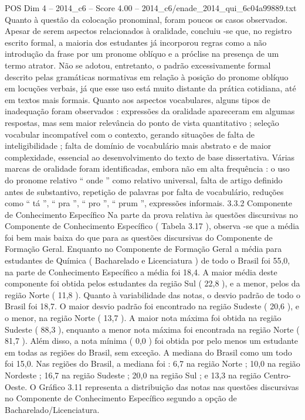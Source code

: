 \begin{textsample}{POS Dim 4 – 2014\_c6 – Score 4.00 – 2014\_c6/enade\_2014\_qui\_6c04a99889.txt}
Quanto à questão da colocação pronominal, foram poucos os casos observados.
Apesar de serem aspectos relacionados à oralidade, concluiu -se que, no registro escrito formal, a maioria dos estudantes já incorporou regras como a não introdução da frase por um pronome oblíquo e a próclise na presença de um termo atrator.
Não se adotou, entretanto, o padrão excessivamente formal descrito pelas gramáticas normativas em relação à posição do pronome oblíquo em locuções verbais, já que esse uso está muito distante da prática cotidiana, até em textos mais formais.
Quanto aos aspectos vocabulares, alguns tipos de inadequação foram observados : expressões da oralidade apareceram em algumas respostas, mas sem maior relevância do ponto de vista quantitativo ; seleção vocabular incompatível com o contexto, gerando situações de falta de inteligibilidade ; falta de domínio de vocabulário mais abstrato e de maior complexidade, essencial ao desenvolvimento do texto de base dissertativa.
Várias marcas de oralidade foram identificadas, embora não em alta frequência : o uso do pronome relativo “ onde ” como relativo universal, falta de artigo definido antes de substantivo, repetição de palavras por falta de vocabulário, reduções como “ tá ”, “ pra ”, “ pro ”, “ prum ”, expressões informais. 3.3.2 Componente de Conhecimento Específico Na parte da prova relativa às questões discursivas no Componente de Conhecimento Específico ( Tabela 3.17 ), observa -se que a média foi bem mais baixa do que para as questões discursivas do Componente de Formação Geral.
Enquanto no Componente de Formação Geral a média para estudantes de Química ( Bacharelado e Licenciatura ) de todo o Brasil foi 55,0, na parte de Conhecimento Específico a média foi 18,4.
A maior média deste componente foi obtida pelos estudantes da região Sul ( 22,8 ), e a menor, pelos da região Norte ( 11,8 ).
Quanto à variabilidade das notas, o desvio padrão de todo o Brasil foi 18,7.
O maior desvio padrão foi encontrado na região Sudeste ( 20,6 ), e o menor, na região Norte ( 13,7 ).
A maior nota máxima foi obtida na região Sudeste ( 88,3 ), enquanto a menor nota máxima foi encontrada na região Norte ( 81,7 ).
Além disso, a nota mínima ( 0,0 ) foi obtida por pelo menos um estudante em todas as regiões do Brasil, sem exceção.
A mediana do Brasil como um todo foi 15,0.
Nas regiões do Brasil, a mediana foi : 6,7 na região Norte ; 10,0 na região Nordeste ; 16,7 na região Sudeste ; 20,0 na região Sul ; e 13,3 na região Centro-Oeste.
O Gráfico 3.11 representa a distribuição das notas nas questões discursivas no Componente de Conhecimento Específico segundo a opção de Bacharelado/Licenciatura.

\end{textsample}
